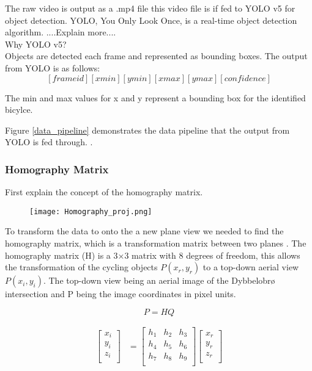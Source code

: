 The raw video is output as a .mp4 file this video file is if fed to YOLO v5 for object detection. YOLO, You Only Look Once,
is a real-time object detection algorithm. ....Explain more.... 
\ \\ 
Why YOLO v5?
\ \\ 
Objects are detected each frame and represented as bounding boxes.
The output from YOLO is as follows: \[ [frame id][xmin][ymin][xmax][ymax][confidence]  \]

The min and max values for x and y represent a bounding box for the identified bicylce.

Figure \ref{data_pipeline} demonstrates the data pipeline that the output from YOLO is fed through. .
\ \\
\subsubsection{Homography Matrix}

First explain the concept of the homography matrix.
\ \\ 
\begin{figure}[h]
  \texttt{[image: Homography\_proj.png]}
  \centering 
  \end{figure}
  \label{homography}

To transform the data to onto the a new plane view we needed to find the homography matrix, which is a transformation matrix between two planes \cite{hartley_zisserman_2004}.
The homography matrix (H) is a 3×3 matrix with 8 degrees of freedom, this allows the transformation of the cycling objects $P(x_r, y_r)$ to a 
top-down aerial view $P(x_i, y_i)$. The top-down view being an aerial image of the Dybbelobrø intersection and P being the image coordinates in pixel units.

\begin{equation}
  P = HQ\label{eq:2}
\end{equation} 

\begin{align}
\label{eq:3}
  \begin{bmatrix}
    x_{i} \\
    y_{i} \\
    z_{i} \\
  \end{bmatrix}
  &= \begin{bmatrix}
      h_1 & h_2 & h_3 \\
      h_4 & h_5 & h_6 \\
      h_7 & h_8 & h_9 \\
  \end{bmatrix}
  \begin{bmatrix}
    x_{r} \\
    y_{r} \\
    z_{r} \\
  \end{bmatrix}
\end{align}
